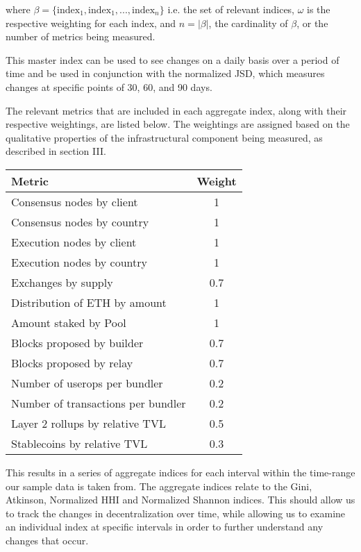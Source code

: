 \documentclass[conference]{IEEEtran}
\begin{document}
\vspace{8pt}

where \(\beta=\{\text{index}_1, \text{index}_1, ..., \text{index}_n\}\) i.e. the set of relevant indices, $\omega$ is the respective weighting for each index, and $n=\left| \beta \right|$, the cardinality of $\beta$, or the number of metrics being measured.

This master index can be used to see changes on a daily basis over a period of time and be used in conjunction with the normalized JSD, which measures changes at specific points of 30, 60, and 90 days.

The relevant metrics that are included in each aggregate index, along with their respective weightings, are listed below. The weightings are assigned based on the qualitative properties of the infrastructural component being measured, as described in section III.

\vspace{12pt}
\begin{table}[h]
\normalsize
\begin{center}
\begin{tabular}{|l|c|}
\hline
\textbf{Metric} & \textbf{Weight} \\ \hline
Consensus nodes by client & 1 \\ \hline
Consensus nodes by country & 1 \\ \hline
Execution nodes by client & 1 \\ \hline
Execution nodes by country & 1 \\ \hline
Exchanges by supply & 0.7 \\ \hline
Distribution of ETH by amount & 1 \\ \hline
Amount staked by Pool & 1 \\ \hline
Blocks proposed by builder & 0.7 \\ \hline
Blocks proposed by relay & 0.7 \\ \hline
Number of userops per bundler & 0.2 \\ \hline
Number of transactions per bundler & 0.2 \\ \hline
Layer 2 rollups by relative TVL & 0.5 \\ \hline
Stablecoins by relative TVL & 0.3 \\ \hline
\end{tabular}
\end{center}
\end{table}
This results in a series of aggregate indices for each interval within the time-range our sample data is taken from.  The aggregate indices relate to the Gini, Atkinson, Normalized HHI and Normalized Shannon indices.  This should allow us to track the changes in decentralization over time, while allowing us to examine an individual index at specific intervals in order to further understand any changes that occur.
\end{document}
